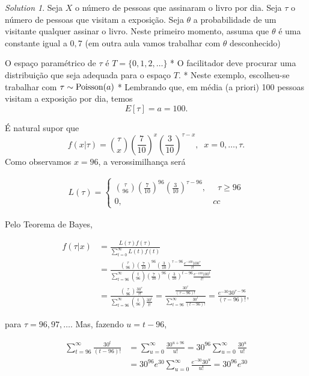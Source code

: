 \documentclass[
  letterpaper,
  DIV=11,
  numbers=noendperiod]{scrreprt}
\theoremstyle{definition}
\theoremstyle{definition}
\theoremstyle{remark}
\newtheorem*{solution}{Solution}
\begin{document}
\begin{solution}

Seja \(X\) o número de pessoas que assinaram o livro por dia. Seja
\(\tau\) o número de pessoas que visitam a exposição. Seja \(\theta\) a
probabilidade de um visitante qualquer assinar o livro. Neste primeiro
momento, assuma que \(\theta\) é uma constante igual a \(0,7\) (em outra
aula vamos trabalhar com \(\theta\) desconhecido)

O espaço paramétrico de \(\tau\) é \(T=\{0,1,2,\ldots\}\) * O
facilitador deve procurar uma distribuição que seja adequada para o
espaço \(T\). * Neste exemplo, escolheu-se trabalhar com
\(\tau\sim\hbox{Poisson}(a)\) * Lembrando que, em média (a priori) 100
pessoas visitam a exposição por dia, temos \[E[\tau]=a=100.\]

É natural supor que
\[f(x|\tau)={\tau \choose x}\left(\frac{7}{10}\right)^x \left(\frac{3}{10}\right)^{\tau-x},\;\; x=0,\ldots,\tau.\]
Como observamos \(x=96\), a verossimilhança será

\[\begin{align}
     L(\tau)=\left\{ \begin{array}{ll}{\tau \choose 96}\left(\frac{7}{10}\right)^{96}\left(\frac{3}{10}\right)^{\tau-96},& \;\; \tau\geq 96\\0,& cc \end{array}\right.
   \end{align}\]

Pelo Teorema de Bayes,

\[\begin{align}
   f(\tau|x)&=\frac{L(\tau)f(\tau)}{\sum_{t=0}^{\infty}L(t)f(t)}\\
   &=\frac{ {\tau \choose 96}\left(\frac{7}{10}\right)^{96} \left(\frac{3}{10}\right)^{\tau-96}\frac{e^{-100}{100}^\tau }{\tau!}}{\sum_{t=96}^{\infty}{t \choose 96}\left(\frac{7}{10}\right)^{96} \left(\frac{3}{10}\right)^{t-96}\frac{e^{-100} {100}^t }{t!}}\\
   &=\frac{{\tau \choose 96}\frac{30^\tau}{\tau!}}{\sum_{t=96}^{\infty}{t \choose 96}\frac{30^t}{t!}}=\frac{\frac{30^\tau}{(\tau-96)!}}{\sum_{t=96}^{\infty}\frac{30^t}{(t-96)!}}=\frac{e^{-30}30^{\tau-96}}{(\tau-96)!},
   \end{align}\]

para \(\tau=96,97,\ldots\). Mas, fazendo \(u=t-96\),

\[\begin{align}
\sum_{t=96}^{\infty}\frac{30^t}{(t-96)!}&=\sum_{u=0}^\infty \frac{30^{u+96}}{u!}=30^{96}\sum_{u=0}^\infty \frac{30^{u}}{u!}\\
&=30^{96}e^{30}\sum_{u=0}^\infty \frac{e^{-30}30^{u}}{u!}=30^{96}e^{30}
\end{align}\]


\end{solution}
\end{document}
